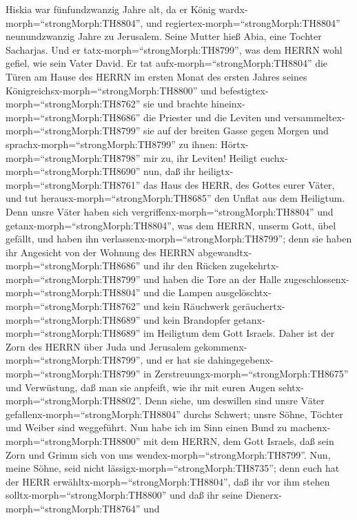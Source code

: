  Hiskia war fünfundzwanzig Jahre alt, da er König
wardx-morph=``strongMorph:TH8804'', und
regiertex-morph=``strongMorph:TH8804'' neunundzwanzig Jahre zu
Jerusalem. Seine Mutter hieß Abia, eine Tochter Sacharjas. 
Und er tatx-morph=``strongMorph:TH8799'', was dem HERRN wohl gefiel, wie
sein Vater David.  Er tat aufx-morph=``strongMorph:TH8804''
die Türen am Hause des HERRN im ersten Monat des ersten Jahres seines
Königreichsx-morph=``strongMorph:TH8800'' und
befestigtex-morph=``strongMorph:TH8762'' sie  und brachte
hineinx-morph=``strongMorph:TH8686'' die Priester und die Leviten und
versammeltex-morph=``strongMorph:TH8799'' sie auf der breiten Gasse
gegen Morgen  und sprachx-morph=``strongMorph:TH8799'' zu
ihnen: Hörtx-morph=``strongMorph:TH8798'' mir zu, ihr Leviten! Heiligt
euchx-morph=``strongMorph:TH8690'' nun, daß ihr
heiligtx-morph=``strongMorph:TH8761'' das Haus des HERR, des Gottes
eurer Väter, und tut herausx-morph=``strongMorph:TH8685'' den Unflat aus
dem Heiligtum.  Denn unsre Väter haben sich
vergriffenx-morph=``strongMorph:TH8804'' und
getanx-morph=``strongMorph:TH8804'', was dem HERRN, unserm Gott, übel
gefällt, und haben ihn verlassenx-morph=``strongMorph:TH8799''; denn sie
haben ihr Angesicht von der Wohnung des HERRN
abgewandtx-morph=``strongMorph:TH8686'' und ihr den Rücken
zugekehrtx-morph=``strongMorph:TH8799''  und haben die Tore
an der Halle zugeschlossenx-morph=``strongMorph:TH8804'' und die Lampen
ausgelöschtx-morph=``strongMorph:TH8762'' und kein Räuchwerk
geräuchertx-morph=``strongMorph:TH8689'' und kein Brandopfer
getanx-morph=``strongMorph:TH8689'' im Heiligtum dem Gott Israels.
 Daher ist der Zorn des HERRN über Juda und Jerusalem
gekommenx-morph=``strongMorph:TH8799'', und er hat sie
dahingegebenx-morph=``strongMorph:TH8799'' in
Zerstreuungx-morph=``strongMorph:TH8675'' und Verwüstung, daß man sie
anpfeift, wie ihr mit euren Augen sehtx-morph=``strongMorph:TH8802''.
 Denn siehe, um deswillen sind unsre Väter
gefallenx-morph=``strongMorph:TH8804'' durchs Schwert; unsre Söhne,
Töchter und Weiber sind weggeführt.  Nun habe ich im Sinn
einen Bund zu machenx-morph=``strongMorph:TH8800'' mit dem HERRN, dem
Gott Israels, daß sein Zorn und Grimm sich von uns
wendex-morph=``strongMorph:TH8799''.  Nun, meine Söhne,
seid nicht lässigx-morph=``strongMorph:TH8735''; denn euch hat der HERR
erwähltx-morph=``strongMorph:TH8804'', daß ihr vor ihm stehen
solltx-morph=``strongMorph:TH8800'' und daß ihr seine
Dienerx-morph=``strongMorph:TH8764'' und
